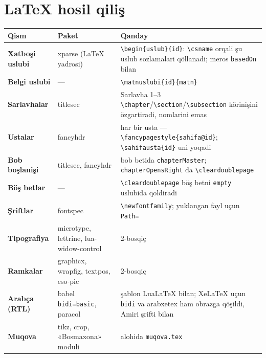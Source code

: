 \documentclass[11pt]{article}
\begin{document}
\section{LaTeX hosil qiliş}\label{sec:tl-latex}
\begin{center}\footnotesize
\begin{tabularx}{\linewidth}{>{\bfseries}p{38mm}>{\raggedright\arraybackslash}p{40mm}X}
\toprule
Qism & Paket & Qanday\\
\midrule
Xatboşi uslubi & xparse (LaTeX yadrosi) & \texttt{\textbackslash begin\{uslub\}\{id\}}: \texttt{\textbackslash csname} orqali şu uslub sozlamalari qöllanadi; meros \texttt{basedOn} bilan\\
Belgi uslubi & --- & \texttt{\textbackslash matnuslubi\{id\}\{matn\}}\\
Sarlavhalar & titlesec & Sarlavha 1--3 \texttt{\textbackslash chapter}/\texttt{\textbackslash section}/\texttt{\textbackslash subsection} körinişini özgartiradi, nomlarini emas\\
Ustalar & fancyhdr & har bir usta --- \texttt{\textbackslash fancypagestyle\{sahifa@id\}}; \texttt{\textbackslash sahifausta\{id\}} uni yoqadi\\
Bob boşlanişi & titlesec, fancyhdr & bob betida \texttt{chapterMaster}; \texttt{chapterOpensRight} da \texttt{\textbackslash cleardoublepage}\\
Böş betlar & --- & \texttt{\textbackslash cleardoublepage} böş betni \texttt{empty} uslubida qoldiradi\\
Şriftlar & fontspec & \texttt{\textbackslash newfontfamily}; yuklangan fayl uçun \texttt{Path=}\\
Tipografiya & microtype, lettrine, lua-widow-control & 2-bosqiç\\
Ramkalar & graphicx, wrapfig, textpos, eso-pic & 2-bosqiç\\
Arabça (RTL) & babel \texttt{bidi=basic}, paracol & şablon LuaLaTeX bilan; XeLaTeX uçun \texttt{bidi} va arabxetex ham obrazga qöşildi, Amiri şrifti bilan\\
Muqova & tikz, crop, «Bosmaxona» moduli & alohida \texttt{muqova.tex}\\
\bottomrule
\end{tabularx}
\end{center}
\end{document}
